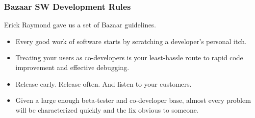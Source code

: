\documentclass[hyperref={pdfpagelabels=false},xcolor=pst,pdf,fragile]{beamer}
\begin{document}
\begin{frame}
  \frametitle{Bazaar SW Development Rules}

  Erick Raymond gave us a set of Bazaar guidelines.
  \begin{itemize}
	  \pause
	\item Every good work of software starts by scratching a developer's
	  personal itch.

	  \pause
	\item Treating your users as co-developers is your least-hassle route
	  to rapid code improvement and effective debugging.

	  \pause
	\item Release early. Release often. And listen to your customers.

	\pause
	\item Given a large enough beta-tester and co-developer base, almost
	  every problem will be characterized quickly and the fix obvious to
	  someone.

  \end{itemize}

\end{frame}
\end{document}
